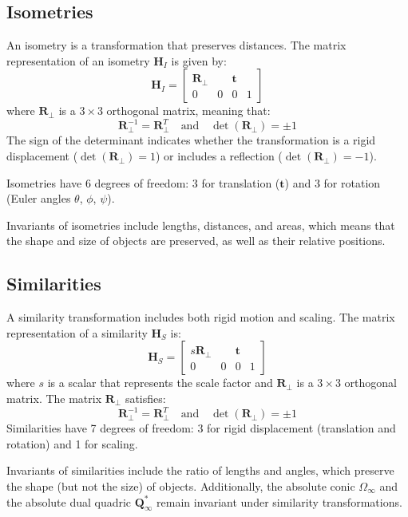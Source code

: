 \subsection{Isometries}
An isometry is a transformation that preserves distances. 
The matrix representation of an isometry $\mathbf{H}_I$ is given by:
\[\mathbf{H}_I = \begin{bmatrix}
    \mathbf{R}_{\perp} & & \mathbf{t} & \\
    0 & 0 & 0 & 1
\end{bmatrix}\]
where $\mathbf{R}_{\perp}$ is a $3 \times 3$ orthogonal matrix, meaning that:
\[\mathbf{R}_{\perp}^{-1} = \mathbf{R}_{\perp}^T \quad \text{and} \quad \det(\mathbf{R}_{\perp}) = \pm 1\]
The sign of the determinant indicates whether the transformation is a rigid displacement ($\det(\mathbf{R}_{\perp}) = 1$) or includes a reflection ($\det(\mathbf{R}_{\perp}) = -1$).

Isometries have 6 degrees of freedom: 3 for translation ($\mathbf{t}$) and 3 for rotation (Euler angles $\theta$, $\phi$, $\psi$).

Invariants of isometries include lengths, distances, and areas, which means that the shape and size of objects are preserved, as well as their relative positions.

\subsection{Similarities}
A similarity transformation includes both rigid motion and scaling. 
The matrix representation of a similarity $\mathbf{H}_S$ is:
\[\mathbf{H}_S = \begin{bmatrix}
    s \mathbf{R}_{\perp} & & \mathbf{t} & \\
    0 & 0 & 0 & 1
\end{bmatrix}\]
where $s$ is a scalar that represents the scale factor and $\mathbf{R}_{\perp}$ is a $3 \times 3$ orthogonal matrix. 
The matrix $\mathbf{R}_{\perp}$ satisfies:
\[\mathbf{R}_{\perp}^{-1} = \mathbf{R}_{\perp}^T \quad \text{and} \quad \det(\mathbf{R}_{\perp}) = \pm 1\]
Similarities have 7 degrees of freedom: 3 for rigid displacement (translation and rotation) and 1 for scaling.

Invariants of similarities include the ratio of lengths and angles, which preserve the shape (but not the size) of objects. 
Additionally, the absolute conic $\Omega_{\infty}$ and the absolute dual quadric $\mathbf{Q}^*_{\infty}$ remain invariant under similarity transformations.

